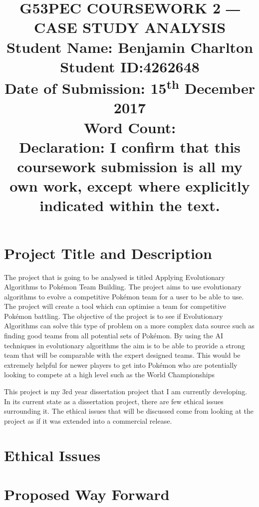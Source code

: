 \documentclass[a4paper]{article}
\newcommand{\Pokemon}{Pok\'{e}mon}
\begin{document}
\title{
    G53PEC COURSEWORK 2 ― CASE STUDY ANALYSIS \\
    \large{Student Name: Benjamin Charlton \\
            Student ID:\@ 4262648 \\
            Date of Submission: 15\textsuperscript{th} December 2017\\
            Word Count: \\
            Declaration: I confirm that this coursework submission is all my own work, except where explicitly indicated within the text.}
    \date{}}
\maketitle

\section{Project Title and Description}
The project that is going to be analysed is titled Applying Evolutionary Algorithms to \Pokemon{} Team Building.
The project aims to use evolutionary algorithms to evolve a competitive \Pokemon{} team for a user to be able to use.
The project will create a tool which can optimise a team for competitive Pokémon battling.
The objective of the project is to see if Evolutionary Algorithms can solve this type of problem on a more complex data source such as finding good teams from all potential sets of Pokémon.
By using the AI techniques in evolutionary algorithms the aim is to be able to provide a strong team that will be comparable with the expert designed teams.
This would be extremely helpful for newer players to get into \Pokemon{} who are potentially looking to compete at a high level such as the World Championships\cite{worldsOverview}
\par
This project is my 3rd year dissertation project that I am currently developing.
In its current state as a dissertation project, there are few ethical issues surrounding it.
The ethical issues that will be discussed come from looking at the project as if it was extended into a commercial release.
\section{Ethical Issues}

\section{Proposed Way Forward}



\end{document}
